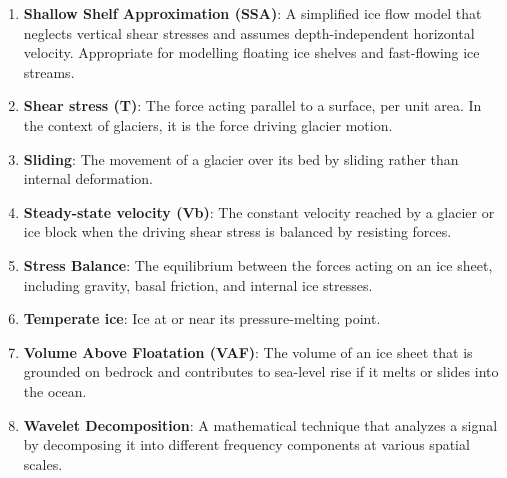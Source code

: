 \begin{enumerate}
\item \textbf{Shallow Shelf Approximation (SSA)}: A simplified ice flow model that neglects vertical shear stresses and assumes depth-independent horizontal velocity. Appropriate for modelling floating ice shelves and fast-flowing ice streams.
\item \textbf{Shear stress (T)}: The force acting parallel to a surface, per unit area. In the context of glaciers, it is the force driving glacier motion.
\item \textbf{Sliding}: The movement of a glacier over its bed by sliding rather than internal deformation.
\item \textbf{Steady-state velocity (Vb)}: The constant velocity reached by a glacier or ice block when the driving shear stress is balanced by resisting forces.
\item \textbf{Stress Balance}: The equilibrium between the forces acting on an ice sheet, including gravity, basal friction, and internal ice stresses.
\item \textbf{Temperate ice}: Ice at or near its pressure-melting point.
\item \textbf{Volume Above Floatation (VAF)}: The volume of an ice sheet that is grounded on bedrock and contributes to sea-level rise if it melts or slides into the ocean.
\item \textbf{Wavelet Decomposition}: A mathematical technique that analyzes a signal by decomposing it into different frequency components at various spatial scales.
\end{enumerate}